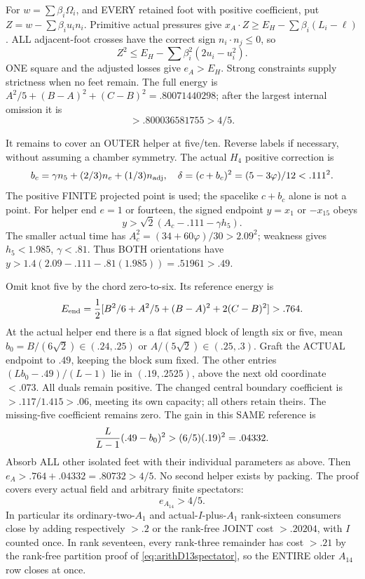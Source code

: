 \documentclass[11pt]{article}
\begin{document}
For \(w=\sum\beta_i\Omega_i\), and EVERY retained
foot with positive coefficient, put
\(Z=w-\sum\beta_i u_i n_i\).
Primitive actual pressures give
\(x_A\cdot Z\ge E_H-\sum\beta_i(L_i-\ell)\).
ALL adjacent-foot crosses have the correct sign
\(n_i\cdot n_j\le0\), so
\[
 Z^2\le E_H-\sum\beta_i^2(2u_i-u_i^2).
\]
ONE square and the adjusted losses give \(e_A>E_H\).
Strong constraints supply strictness when no
feet remain.
The full energy is
\(A^2/5+(B-A)^2+(C-B)^2=.80071440298\);
after the largest internal omission it is
\[
                              >.800036581755>4/5 .
\]

It remains to cover an OUTER helper at five/ten.
Reverse labels if necessary, without assuming
a chamber symmetry.
The actual \(H_4\) positive correction is
\[
 b_c=\gamma n_5+(2/3)n_e+(1/3)n_{\rm adj},\quad
 \delta=(c+b_c)^2=(5-3\varphi)/12<.111^2 .
\]
The positive FINITE projected point is used;
the spacelike \(c+b_c\) alone is not a point.
For helper end \(e=1\) or fourteen, the signed
endpoint \(y=x_1\) or \(-x_{15}\) obeys
\[
                    y>\sqrt2(A_c-.111-\gamma h_5).
\]
The smaller actual time has
\(A_c^2=(34+60\varphi)/30>2.09^2\);
weakness gives \(h_5<1.985\), \(\gamma<.81\).
Thus BOTH orientations have
\(y>1.4(2.09-.111-.81(1.985))=.51961>.49\).

Omit knot five by the chord zero-to-six.
Its reference energy is
\[
 E_{\rm end}={1\over2}
       [B^2/6+A^2/5+(B-A)^2+2(C-B)^2]>.764 .
\]
At the actual helper end there is a flat signed
block of length six or five, mean
\(b_0=B/(6\sqrt2)\in(.24,.25)\) or
\(A/(5\sqrt2)\in(.25,.3)\).
Graft the ACTUAL endpoint to \(.49\),
keeping the block sum fixed.
The other entries
\((Lb_0-.49)/(L-1)\) lie in \((.19,.2525)\),
above the next old coordinate \(<.073\).
All duals remain positive.
The changed central boundary coefficient is
\(>.117/1.415>.06\), meeting its own capacity;
all others retain theirs.
The missing-five coefficient remains zero.
The gain in this SAME reference is
\[
                  {L\over L-1}(.49-b_0)^2
                                  >(6/5)(.19)^2=.04332 .
\]
Absorb ALL other isolated feet with their
individual parameters as above.
Then \(e_A>.764+.04332=.80732>4/5\).
No second helper exists by packing.
The proof covers every actual field and
arbitrary finite spectators:
\[
                                  e_{A_{14}}>4/5 .
\tag{A14U}\label{eq:arithA14universal}
\]
In particular its ordinary-two-\(A_1\) and
actual-\(I\)-plus-\(A_1\) rank-sixteen consumers
close by adding respectively \(>.2\) or the
rank-free JOINT cost \(>.20204\), with \(I\)
counted once.
In rank seventeen, every rank-three remainder
has cost \(>.21\) by the rank-free partition proof of
\eqref{eq:arithD13spectator}, so the ENTIRE
older \(A_{14}\) row closes at once.
\end{document}

